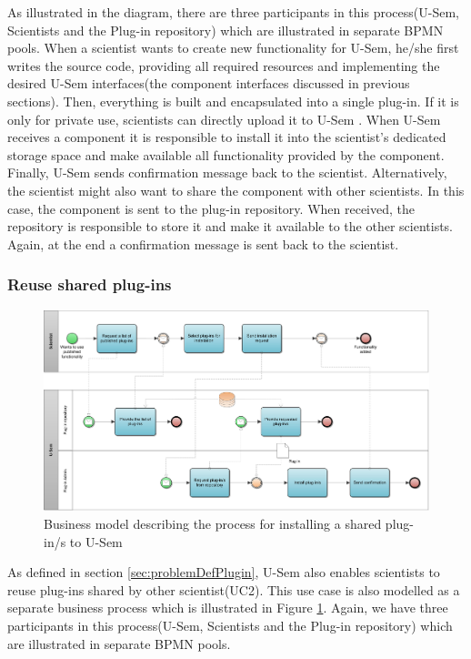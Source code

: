 As illustrated in the diagram, there are three participants in this process(U-Sem, Scientists and the Plug-in repository) which are illustrated in separate BPMN pools. When a scientist wants to create new functionality for U-Sem, he/she first writes the source code, providing all required resources and implementing the desired U-Sem interfaces(the component interfaces discussed in previous sections). Then, everything is built and encapsulated into a single plug-in. If it is only for private use, scientists can directly upload it to U-Sem . When U-Sem receives a component it is responsible to install it into the scientist's dedicated storage space and make available all functionality provided by the component. Finally, U-Sem sends confirmation message back to the scientist. Alternatively, the scientist might also want to share the component with other scientists. In this case, the component is sent to the plug-in repository. When received, the repository is responsible to store it and make it available to the other scientists. Again, at the end a confirmation message is sent back to the scientist.

\subsubsection{Reuse shared plug-ins}

\begin{figure}[h!]
  \centering
  	\includegraphics[scale=0.7,angle=90]{plug-in/business_processes/InstallPlugInFromRepoBusinessModel.jpg}
  \caption{Business model describing the process for installing a shared plug-in/s to U-Sem}
  \label{fig_repo_bpm}
\end{figure}

As defined in section \ref{sec:problemDefPlugin}, U-Sem also enables scientists to reuse plug-ins shared by other scientist(UC2). This use case is also modelled as a separate business process which is illustrated in Figure \ref{fig_repo_bpm}. Again, we have three participants in this process(U-Sem, Scientists and the Plug-in repository) which are illustrated in separate BPMN pools. 

